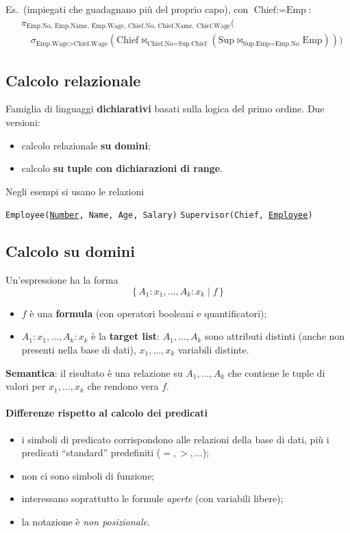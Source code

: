 \documentclass[a4paper,12pt]{article}
\begin{document}
Es.\ (impiegati che guadagnano più del proprio capo), con
$\text{Chief} := \text{Emp}$:
\begin{align*}
  & \pi_{\text{Emp.No},\,\text{Emp.Name},\,\text{Emp.Wage},\,\text{Chief.No},\,
    \text{Chief.Name},\,\text{Chief.Wage}}\bigl(\\
  & \quad \sigma_{\text{Emp.Wage} > \text{Chief.Wage}}(
    \text{Chief} \bowtie_{\text{Chief.No} = \text{Sup.Chief}}
    (\text{Sup} \bowtie_{\text{Sup.Emp} = \text{Emp.No}} \text{Emp}))\bigr)
\end{align*}

\subsection{Calcolo relazionale}

Famiglia di linguaggi \textbf{dichiarativi} basati sulla logica del primo
ordine. Due versioni:
\begin{itemize}
  \item calcolo relazionale \textbf{su domini};
  \item calcolo \textbf{su tuple con dichiarazioni di range}.
\end{itemize}

Negli esempi si usano le relazioni
\begin{center}
\texttt{Employee(\underline{Number}, Name, Age, Salary)} \qquad
\texttt{Supervisor(Chief, \underline{Employee})}
\end{center}

\subsection{Calcolo su domini}

Un'espressione ha la forma
\[
  \{\, A_1 : x_1, \ldots, A_k : x_k \mid f \,\}
\]
\begin{itemize}
  \item $f$ è una \textbf{formula} (con operatori booleani e quantificatori);
  \item $A_1 : x_1, \ldots, A_k : x_k$ è la \textbf{target list}: $A_1, \ldots,
    A_k$ sono attributi distinti (anche non presenti nella base di dati),
    $x_1, \ldots, x_k$ variabili distinte.
\end{itemize}
\textbf{Semantica}: il risultato è una relazione su $A_1, \ldots, A_k$ che
contiene le tuple di valori per $x_1, \ldots, x_k$ che rendono vera $f$.

\paragraph{Differenze rispetto al calcolo dei predicati}
\begin{itemize}
  \item i simboli di predicato corrispondono alle relazioni della base di dati,
    più i predicati ``standard'' predefiniti ($=, >, \ldots$);
  \item non ci sono simboli di funzione;
  \item interessano soprattutto le formule \emph{aperte} (con variabili
    libere);
  \item la notazione è \emph{non posizionale}.
\end{itemize}
\end{document}
